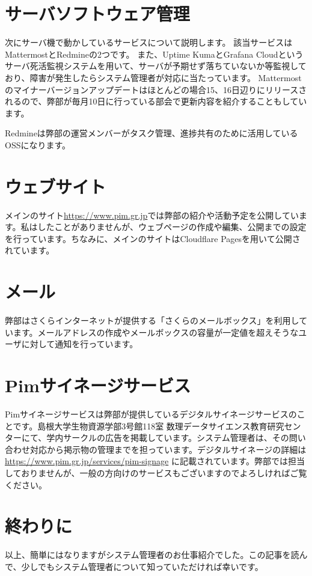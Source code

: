 \documentclass[a4paper,11pt]{jsarticle}
\begin{document}
\section{サーバソフトウェア管理}
次にサーバ機で動かしているサービスについて説明します。
該当サービスはMattermostとRedmineの2つです。
また、Uptime KumaとGrafana Cloudというサーバ死活監視システムを用いて、サーバが予期せず落ちていないか等監視しており、障害が発生したらシステム管理者が対応に当たっています。
Mattermostのマイナーバージョンアップデートはほとんどの場合15、16日辺りにリリースされるので、弊部が毎月10日に行っている部会で更新内容を紹介することもしています。

Redmineは弊部の運営メンバーがタスク管理、進捗共有のために活用しているOSSになります。

\section{ウェブサイト}
メインのサイト\url{https://www.pim.gr.jp}では弊部の紹介や活動予定を公開しています。私はしたことがありませんが、ウェブページの作成や編集、公開までの設定を行っています。ちなみに、メインのサイトはCloudflare Pagesを用いて公開されています。

\section{メール}
弊部はさくらインターネットが提供する「さくらのメールボックス」を利用しています。メールアドレスの作成やメールボックスの容量が一定値を超えそうなユーザに対して通知を行っています。

\section{Pimサイネージサービス}
Pimサイネージサービスは弊部が提供しているデジタルサイネージサービスのことです。島根大学生物資源学部3号館118室 数理データサイエンス教育研究センターにて、学内サークルの広告を掲載しています。システム管理者は、その問い合わせ対応から掲示物の管理までを担っています。デジタルサイネージの詳細は \url{https://www.pim.gr.jp/services/pim-signage} に記載されています。弊部では担当しておりませんが、一般の方向けのサービスもございますのでよろしければご覧ください。

\section{終わりに}
以上、簡単にはなりますがシステム管理者のお仕事紹介でした。この記事を読んで、少しでもシステム管理者について知っていただければ幸いです。
\end{document}
